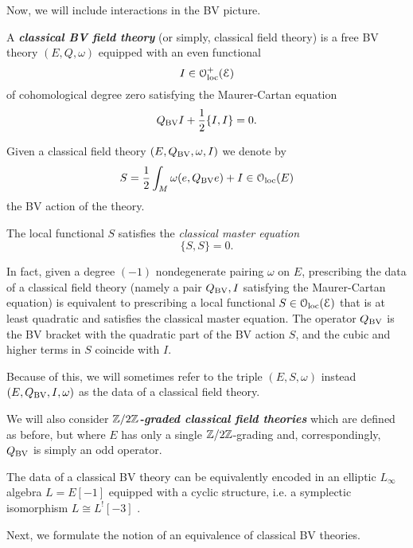 \documentclass[10pt, oneside]{article}
\newcommand{\defterm}[1]{\textbf{\emph{#1}}}
\begin{document}

Now, we will include interactions in the BV picture. 

\begin{definition}
A \defterm{classical BV field theory} (or simply, classical field theory) is a free BV theory $(E, Q, \omega)$ equipped with an even functional
\[I \in \mathcal{O}_{\rm loc}^+(\mathcal E)\]
of cohomological degree zero satisfying the Maurer-Cartan equation
\[Q_{\mathrm{BV}} I + \frac{1}{2} \{I,I\} = 0 .\]
\end{definition}

Given a classical field theory $(E, Q_{\mathrm{BV}}, \omega, I)$ we denote by
\[S = \frac{1}{2} \int_M \omega(e, Q_{\mathrm{BV}} e) + I\in \mathcal{O}_{\rm loc}(E)\]
the BV action of the theory.

The local functional $S$ satisfies the {\em classical master equation} \[\{S, S\} = 0.\] 

In fact, given a degree $(-1)$ nondegenerate pairing $\omega$ on $E$, prescribing the data of a classical field theory (namely a pair $Q_{\mathrm{BV}}, I$ satisfying the Maurer-Cartan equation) is equivalent to prescribing a local functional $S \in \mathcal{O}_{\rm loc}(\mathcal E)$ that is at least quadratic and satisfies the classical master equation.
The operator $Q_{\mathrm{BV}}$ is the BV bracket with the quadratic part of the BV action $S$, and the cubic and higher terms in $S$ coincide with $I$.

Because of this, we will sometimes refer to the triple $(E, S, \omega)$ instead $(E, Q_{\mathrm{BV}}, I, \omega)$ as the data of a classical field theory.

\begin{remark}
We will also consider \defterm{$\mathbb Z/2\mathbb Z$-graded classical field theories} which are defined as before, but where $E$ has only a single $\mathbb Z/2\mathbb Z$-grading and, correspondingly, $Q_{\mathrm{BV}}$ is simply an odd operator.
\end{remark}

\begin{remark}
The data of a classical BV theory can be equivalently encoded in an elliptic $L_\infty$ algebra $L=E[-1]$ equipped with a cyclic structure, i.e. a symplectic isomorphism $L\cong L^![-3]$ \cite[Chapter 5.4]{Book2}. 
\end{remark}

Next, we formulate the notion of an equivalence of classical BV theories. 
\end{document}
